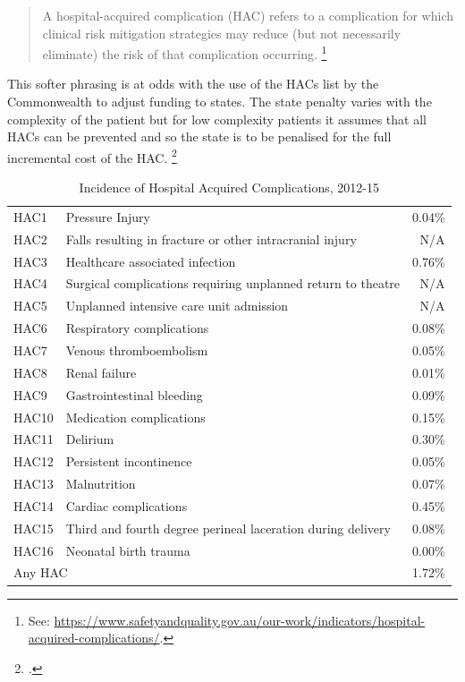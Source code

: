 \documentclass[FrontPage]{grattan}
\begin{document}
\begin{quote}
A hospital-acquired complication (HAC) refers to a complication for which clinical risk mitigation strategies may reduce (but not necessarily eliminate) the risk of that complication occurring.%
	\footnote{See: \textcolor{blue}{\url{https://www.safetyandquality.gov.au/our-work/indicators/hospital-acquired-complications/}}.}
\end{quote}

This softer phrasing is at odds with the use of the HACs list by the Commonwealth to adjust funding to states.
The state penalty varies with the complexity of the patient but for low complexity patients it assumes that 
all HACs can be prevented and so the state is to be penalised for the full incremental cost of the HAC.%
	\footcite{IHPA-2017-Risk-adj-model-tech-specs}

\begin{table}
\caption{Incidence of Hospital Acquired Complications, 2012-15}\label{tbl:incidence-of-hospital-acquired-complications}
\begin{tabularx}{\linewidth}{lXr}
\toprule
HAC1 & Pressure Injury                                              & 0.04\%\tabularnewline
HAC2 & Falls resulting in fracture or other intracranial injury     & N/A\tabularnewline
HAC3 & Healthcare associated infection                              & 0.76\%\tabularnewline
HAC4 & Surgical complications requiring unplanned return to theatre & N/A\tabularnewline
HAC5 & Unplanned intensive care unit admission                      & N/A\tabularnewline
HAC6 & Respiratory complications                                    & 0.08\%\tabularnewline
HAC7 & Venous thromboembolism                                       & 0.05\%\tabularnewline
HAC8 & Renal failure                                                & 0.01\%\tabularnewline
HAC9 & Gastrointestinal bleeding                                    & 0.09\%\tabularnewline
HAC10 & Medication complications                                    & 0.15\%\tabularnewline
HAC11 & Delirium                                                    & 0.30\%\tabularnewline
HAC12 & Persistent incontinence                                     & 0.05\%\tabularnewline
HAC13 & Malnutrition                                                & 0.07\%\tabularnewline
HAC14 & Cardiac complications                                       & 0.45\%\tabularnewline
HAC15 & Third and fourth degree perineal laceration during delivery & 0.08\%\tabularnewline
HAC16 & Neonatal birth trauma                                       & 0.00\%\tabularnewline
\multicolumn{2}{l}{Any HAC}                                       & 1.72\%\tabularnewline
\bottomrule
\end{tabularx}
\end{table}
\end{document}
